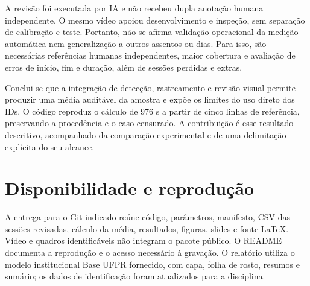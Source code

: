 \documentclass[12pt,a4paper,twoside,openany,chapter=TITLE,subsection=TITLE,section=TITLE,subsubsection=TITLE,english,brazil]{abntex2}
\begin{document}
A revisão foi executada por IA e não recebeu dupla anotação humana independente. O mesmo vídeo apoiou desenvolvimento e inspeção, sem separação de calibração e teste. Portanto, não se afirma validação operacional da medição automática nem generalização a outros assentos ou dias. Para isso, são necessárias referências humanas independentes, maior cobertura e avaliação de erros de início, fim e duração, além de sessões perdidas e extras.

Conclui-se que a integração de detecção, rastreamento e revisão visual permite produzir uma média auditável da amostra e expõe os limites do uso direto dos IDs. O código reproduz o cálculo de 976 s a partir de cinco linhas de referência, preservando a procedência e o caso censurado. A contribuição é esse resultado descritivo, acompanhado da comparação experimental e de uma delimitação explícita do seu alcance.

\section{Disponibilidade e reprodução}
A entrega para o Git indicado reúne código, parâmetros, manifesto, CSV das sessões revisadas, cálculo da média, resultados, figuras, slides e fonte \LaTeX. Vídeo e quadros identificáveis não integram o pacote público. O README documenta a reprodução e o acesso necessário à gravação. O relatório utiliza o modelo institucional Base UFPR fornecido, com capa, folha de rosto, resumos e sumário; os dados de identificação foram atualizados para a disciplina.

\postextual

\end{document}

